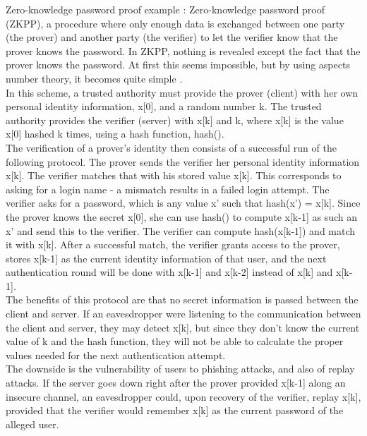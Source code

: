 \documentclass[11pt]{article}
\begin{document}
Zero-knowledge password proof example \cite{huth}:
Zero-knowledge password proof (ZKPP), a procedure where only enough data is exchanged between one party (the prover) and another party (the verifier) to let the verifier know that the prover knows the password.  In ZKPP, nothing is revealed except the fact that the prover knows the password.  At first this seems impossible, but by using aspects number theory, it becomes quite simple \cite{gqprotocol}.\\
	In this scheme, a trusted authority must provide the prover (client) with her own personal identity information, x[0], and a random number k.  The trusted authority provides the verifier (server) with x[k] and k, where x[k] is the value x[0] hashed k times, using a hash function, hash().\\
	The verification of a prover's identity then consists of a successful run of the following protocol.  The prover sends the verifier her personal identity information x[k].  The verifier matches that with his stored value x[k].  This corresponds to asking for a login name - a mismatch results in a failed login attempt.  The verifier asks for a password, which is any value x' such that hash(x') = x[k]. Since the prover knows the secret x[0], she can use hash() to compute x[k-1] as such an x' and send this to the verifier.  The verifier can compute hash(x[k-1]) and match it with x[k].  After a successful match, the verifier grants access to the prover, stores x[k-1] as the current identity information of that user, and the next authentication round will be done with x[k-1] and x[k-2] instead of x[k] and x[k-1].\\
	The benefits of this protocol are that no secret information is passed between the client and server.  If an eavesdropper were listening to the communication between the client and server, they may detect x[k], but since they don't know the current value of k and the hash function, they will not be able to calculate the proper values needed for the next authentication attempt.\\
	The downside is the vulnerability of users to phishing attacks, and also of replay attacks.  If the server goes down right after the prover provided x[k-1] along an insecure channel, an eavesdropper could, upon recovery of the verifier, replay x[k], provided that the verifier would remember x[k] as the current password of the alleged user.
\end{document}
